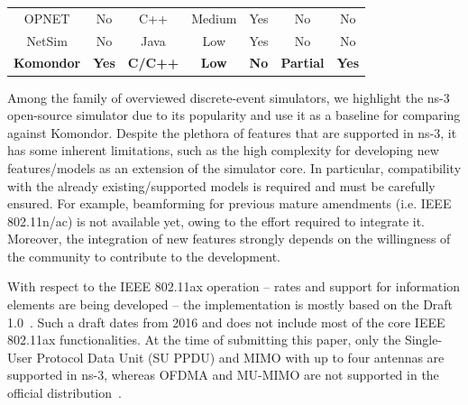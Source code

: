 \documentclass[conference]{IEEEtran}
\begin{document}
\begin{table}[t]
{\begin{tabular}{@{}ccccccc@{}}
				OPNET     & No          & C++                                                       & Medium     & Yes                                                         & No                                                      & No                                                        \\
				NetSim    & No          & Java                                                      & Low        & Yes                                                         & No                                                      & No                                                        \\
				\textbf{Komondor}  & \textbf{Yes}         & \textbf{C/C++}                                                     & \textbf{Low}        & \textbf{No}                                                          & \textbf{Partial}                                                 & \textbf{Yes}                                                       \\ \bottomrule
		\end{tabular}}
	\end{table}
	
	Among the family of overviewed discrete-event simulators, we highlight the ns-3 open-source simulator due to its popularity and use it as a baseline for comparing against Komondor. Despite the plethora of features that are supported in ns-3, it has some inherent limitations, such as the high complexity for developing new features/models as an extension of the simulator core. In particular, compatibility with the already existing/supported models is required and must be carefully ensured. For example, beamforming for previous mature amendments (i.e. IEEE 802.11n/ac) is not available yet, owing to the effort required to integrate it. Moreover, the integration of new features strongly depends on the willingness of the community to contribute to the development.
	
	With respect to the IEEE 802.11ax operation -- rates and support for information elements are being developed -- the implementation is mostly based on the Draft 1.0~\cite{stacey2016proposed}. Such a draft dates from 2016 and does not include most of the core IEEE 802.11ax functionalities. At the time of submitting this paper, only the Single-User Protocol Data Unit (SU PPDU) and MIMO with up to four antennas are supported in ns-3, whereas OFDMA and MU-MIMO are not supported in the official distribution~\cite{ns3documentation}.
	
\end{document}
